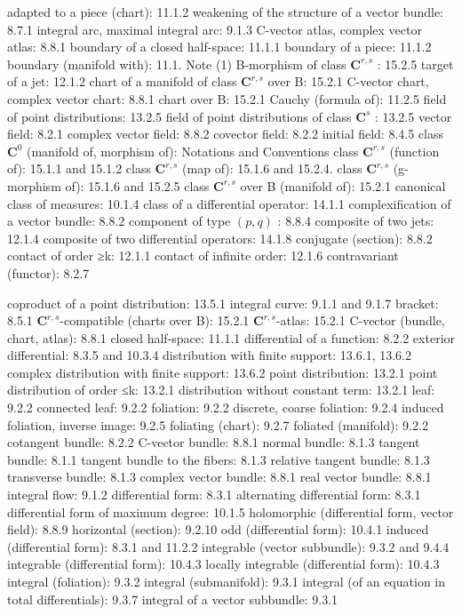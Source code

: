 
adapted to a piece (chart): 11.1.2 weakening of the structure of a vector bundle: 8.7.1 integral arc, maximal integral arc: 9.1.3 C-vector atlas, complex vector atlas: 8.8.1 boundary of a closed half-space: 11.1.1 boundary of a piece: 11.1.2 boundary (manifold with): 11.1. Note (1) B-morphism of class \(\mathbf{C}^{r,s}\) : 15.2.5 target of a jet: 12.1.2 chart of a manifold of class \(\mathbf{C}^{r,s}\) over B: 15.2.1 C-vector chart, complex vector chart: 8.8.1 chart over B: 15.2.1 Cauchy (formula of): 11.2.5 field of point distributions: 13.2.5 field of point distributions of class \(\mathbf{C}^s\) : 13.2.5 vector field: 8.2.1 complex vector field: 8.8.2 covector field: 8.2.2 initial field: 8.4.5 class \(\mathbf{C}^0\) (manifold of, morphism of): Notations and Conventions class \(\mathbf{C}^{r,s}\) (function of): 15.1.1 and 15.1.2 class \(\mathbf{C}^{r,s}\) (map of): 15.1.6 and 15.2.4. class \(\mathbf{C}^{r,s}\) (g-morphism of): 15.1.6 and 15.2.5 class \(\mathbf{C}^{r,s}\) over B (manifold of): 15.2.1 canonical class of measures: 10.1.4 class of a differential operator: 14.1.1 complexification of a vector bundle: 8.8.2 component of type \((p,q)\) : 8.8.4 composite of two jets: 12.1.4 composite of two differential operators: 14.1.8 conjugate (section): 8.8.2 contact of order ≥k: 12.1.1 contact of infinite order: 12.1.6 contravariant (functor): 8.2.7

coproduct of a point distribution: 13.5.1 integral curve: 9.1.1 and 9.1.7 bracket: 8.5.1 \(\mathbf{C}^{r,s}\)-compatible (charts over B): 15.2.1 \(\mathbf{C}^{r,s}\)-atlas: 15.2.1 C-vector (bundle, chart, atlas): 8.8.1 closed half-space: 11.1.1 differential of a function: 8.2.2 exterior differential: 8.3.5 and 10.3.4 distribution with finite support: 13.6.1, 13.6.2 complex distribution with finite support: 13.6.2 point distribution: 13.2.1 point distribution of order ≤k: 13.2.1 distribution without constant term: 13.2.1 leaf: 9.2.2 connected leaf: 9.2.2 foliation: 9.2.2 discrete, coarse foliation: 9.2.4 induced foliation, inverse image: 9.2.5 foliating (chart): 9.2.7 foliated (manifold): 9.2.2 cotangent bundle: 8.2.2 C-vector bundle: 8.8.1 normal bundle: 8.1.3 tangent bundle: 8.1.1 tangent bundle to the fibers: 8.1.3 relative tangent bundle: 8.1.3 transverse bundle: 8.1.3 complex vector bundle: 8.8.1 real vector bundle: 8.8.1 integral flow: 9.1.2 differential form: 8.3.1 alternating differential form: 8.3.1 differential form of maximum degree: 10.1.5 holomorphic (differential form, vector field): 8.8.9 horizontal (section): 9.2.10 odd (differential form): 10.4.1 induced (differential form): 8.3.1 and 11.2.2 integrable (vector subbundle): 9.3.2 and 9.4.4 integrable (differential form): 10.4.3 locally integrable (differential form): 10.4.3 integral (foliation): 9.3.2 integral (submanifold): 9.3.1 integral (of an equation in total differentials): 9.3.7 integral of a vector subbundle: 9.3.1

